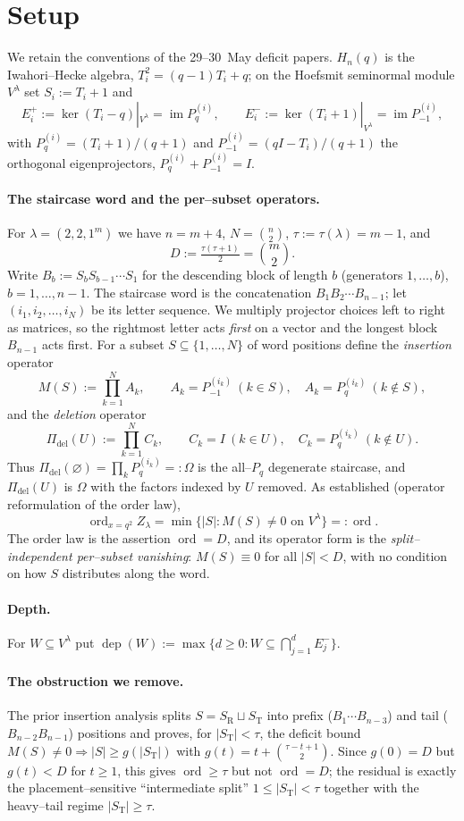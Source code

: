 \documentclass[11pt]{article}
\theoremstyle{definition}
\DeclareMathOperator{\im}{im}
\DeclareMathOperator{\dep}{dep}
\DeclareMathOperator{\ord}{ord}
\newcommand{\Vlam}{V^\lambda}
\newcommand{\Ep}[1]{E^{+}_{#1}}
\newcommand{\Em}[1]{E^{-}_{#1}}
\newcommand{\Pq}{P_{q}}
\newcommand{\Pm}{P_{-1}}
\newcommand{\Pdel}{\Pi_{\mathrm{del}}}
\newcommand{\St}{S_{\mathrm T}}
\newcommand{\Sr}{S_{\mathrm R}}
\begin{document}
\section{Setup}\label{sec:setup}

We retain the conventions of the 29--30~May deficit papers. $H_n(q)$ is the Iwahori--Hecke
algebra, $T_i^2=(q-1)T_i+q$; on the Hoefsmit seminormal module $\Vlam$ set $S_i:=T_i+1$ and
\[
   \Ep i:=\ker(T_i-q)|_{\Vlam}=\im\Pq^{(i)},\qquad
   \Em i:=\ker(T_i+1)|_{\Vlam}=\im\Pm^{(i)},
\]
with $\Pq^{(i)}=(T_i+1)/(q+1)$ and $\Pm^{(i)}=(qI-T_i)/(q+1)$ the orthogonal eigenprojectors,
$\Pq^{(i)}+\Pm^{(i)}=I$.

\paragraph{The staircase word and the per--subset operators.}
For $\lambda=(2,2,1^m)$ we have $n=m+4$, $N=\binom n2$, $\tau:=\tau(\lambda)=m-1$, and
\[
   D:=\tfrac{\tau(\tau+1)}2=\binom m2 .
\]
Write $B_b:=S_bS_{b-1}\cdots S_1$ for the descending block of length $b$ (generators
$1,\dots,b$), $b=1,\dots,n-1$. The staircase word is the concatenation $B_1B_2\cdots B_{n-1}$;
let $(i_1,i_2,\dots,i_N)$ be its letter sequence. We multiply projector choices left to right
as matrices, so the rightmost letter acts \emph{first} on a vector and the longest block
$B_{n-1}$ acts first. For a subset $S\subseteq\{1,\dots,N\}$ of word positions define the
\emph{insertion} operator
\[
   M(S):=\prod_{k=1}^{N}A_k,\qquad A_k=\Pm^{(i_k)}\ (k\in S),\quad A_k=\Pq^{(i_k)}\ (k\notin S),
\]
and the \emph{deletion} operator
\[
   \Pdel(U):=\prod_{k=1}^{N}C_k,\qquad C_k=I\ (k\in U),\quad C_k=\Pq^{(i_k)}\ (k\notin U).
\]
Thus $\Pdel(\varnothing)=\prod_k\Pq^{(i_k)}=:\Omega$ is the all--$\Pq$ degenerate staircase, and
$\Pdel(U)$ is $\Omega$ with the factors indexed by $U$ removed. As established (operator
reformulation of the order law),
\[
   \ord_{x=q^2}Z_\lambda=\min\{|S|:M(S)\neq0 \text{ on } \Vlam\}=:\ord .
\]
The order law is the assertion $\ord=D$, and its operator form is the
\emph{split--independent per--subset vanishing}: $M(S)\equiv0$ for all $|S|<D$, with no
condition on how $S$ distributes along the word.

\paragraph{Depth.} For $W\subseteq\Vlam$ put
$\dep(W):=\max\{d\ge0:W\subseteq\bigcap_{j=1}^d\Em j\}$.

\paragraph{The obstruction we remove.} The prior insertion analysis splits $S=\Sr\sqcup\St$ into
prefix ($B_1\cdots B_{n-3}$) and tail ($B_{n-2}B_{n-1}$) positions and proves, for $|\St|<\tau$,
the deficit bound $M(S)\neq0\Rightarrow|S|\ge g(|\St|)$ with
$g(t)=t+\binom{\tau-t+1}2$. Since $g(0)=D$ but $g(t)<D$ for $t\ge1$, this gives $\ord\ge\tau$ but
not $\ord=D$; the residual is exactly the placement--sensitive ``intermediate split''
$1\le|\St|<\tau$ together with the heavy--tail regime $|\St|\ge\tau$.
\end{document}
